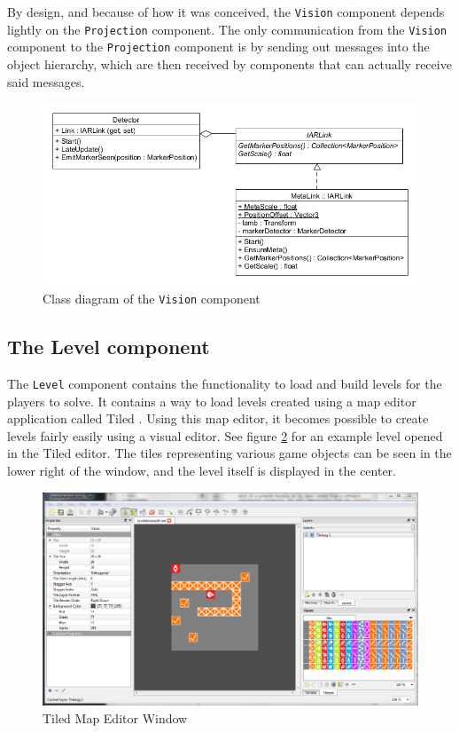 			By design, and because of how it was conceived, the \texttt{Vision} 
			component depends lightly on the \texttt{Projection} component.
			The only communication from the \texttt{Vision} component to the 
			\texttt{Projection} component is by sending out messages into the 
			object hierarchy, which are then received by components that can 
			actually receive said messages. 
			
			\begin{figure}[ht]
				\includegraphics[width=\textwidth]{ClassDiagramVision}
				\caption{Class diagram of the \texttt{Vision} component}
				\label{fig:classdiagramvision}
			\end{figure}
			
		\subsection{The Level component} 
            The \texttt{Level} component contains the functionality to load 
            and build levels for the players to solve. It contains a way to 
            load levels created using a map editor application called 
            Tiled \cite{tiled}. Using this map editor, it becomes possible
            to create levels fairly easily using a visual editor. See figure
            \ref{fig:tilededitor} for an example level opened in the Tiled
            editor. The tiles representing various game objects can be seen in
            the lower right of the window, and the level itself is displayed in
            the center.
            
            \begin{figure}[ht]
                \includegraphics[width=\textwidth]{TiledEditorWindow}
                \caption{Tiled Map Editor Window}
                \label{fig:tilededitor}
            \end{figure}

